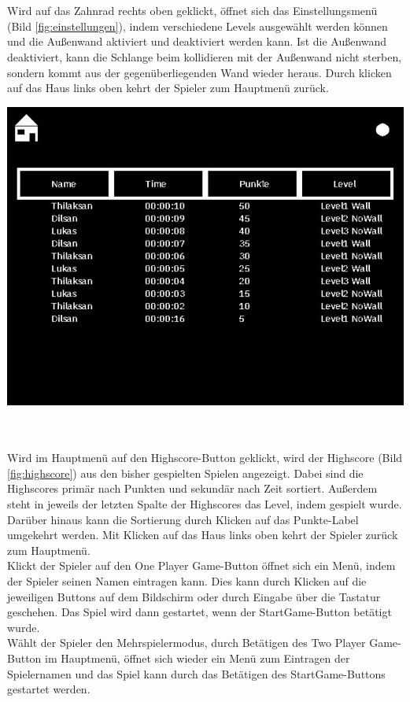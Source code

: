 \newline \\ \\
Wird auf das Zahnrad rechts oben geklickt, {\"o}ffnet sich das Einstellungsmen{\"u} (Bild \ref{fig:einstellungen}), indem verschiedene Levels ausgew{\"a}hlt werden k{\"o}nnen und die Au{\ss}enwand aktiviert und deaktiviert werden kann. Ist die Au{\ss}enwand deaktiviert, kann die Schlange beim kollidieren mit der Au{\ss}enwand nicht sterben, sondern kommt aus der gegenüberliegenden Wand wieder heraus. Durch klicken auf das Haus links oben kehrt der Spieler zum Hauptmen{\"u} zur{\"u}ck.\newline \newline \\ 
\begin{minipage}[X]{1.1\textwidth}
 \centering
 \includegraphics[scale=0.5]{bilder/Highscore}
 \label{fig:highscore}
\end{minipage}
\newline \\ \\
Wird im Hauptmen{\"u} auf den Highscore-Button geklickt, wird der Highscore (Bild \ref{fig:highscore}) aus den bisher gespielten Spielen angezeigt. Dabei sind die Highscores prim{\"a}r nach Punkten und sekund{\"a}r nach Zeit sortiert. Au{\ss}erdem steht in jeweils der letzten Spalte der Highscores das Level, indem gespielt wurde. Darüber hinaus kann die Sortierung durch Klicken auf das Punkte-Label umgekehrt werden. Mit Klicken auf das Haus links oben kehrt der Spieler zur{\"u}ck zum Hauptmen{\"u}.
\\
 Klickt der Spieler auf den \glqq One Player Game\grqq{}-Button {\"o}ffnet sich ein Men{\"u}, indem der Spieler seinen Namen eintragen kann. Dies kann durch Klicken auf die jeweiligen Buttons auf dem Bildschirm oder durch Eingabe {\"u}ber die Tastatur geschehen. Das Spiel wird dann gestartet, wenn der StartGame-Button bet{\"a}tigt wurde.\\
W{\"a}hlt der Spieler den Mehrspielermodus, durch Bet{\"a}tigen des 	\glqq Two Player Game\grqq{}-Button im Hauptmen{\"u}, {\"o}ffnet sich wieder ein Men{\"u} zum Eintragen der Spielernamen und das Spiel kann durch das Bet{\"a}tigen des StartGame-Buttons gestartet werden.  


